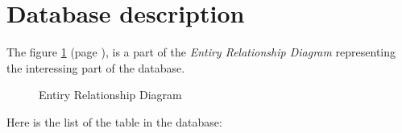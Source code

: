 \section{Database description} %
\label{sec:database_description}

The figure \ref{fig:erd} (page \pageref{fig:erd}), is a part of the \emph{Entiry Relationship Diagram} representing the interessing part of the database.

\begin{figure}[h!]
\centering
{}
% 
\decoRule
\caption[Entiry Relationship Diagram]{Entiry Relationship Diagram}
\label{fig:erd}
\end{figure}

Here is the list of the table in the database:


